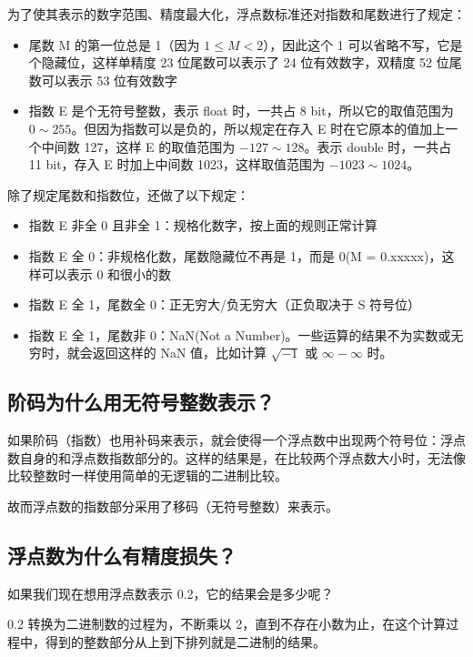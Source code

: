 为了使其表示的数字范围、精度最大化，浮点数标准还对指数和尾数进行了规定：

\begin{itemize}
  \item 尾数 M 的第一位总是 1（因为 $1 \leq M < 2$），因此这个 1 可以省略不写，它是个隐藏位，这样单精度 23 位尾数可以表示了 24 位有效数字，双精度 52 位尾数可以表示 53 位有效数字
  \item 指数 E 是个无符号整数，表示 float 时，一共占 8 bit，所以它的取值范围为 $0 \sim 255$。但因为指数可以是负的，所以规定在存入 E 时在它原本的值加上一个中间数 127，这样 E 的取值范围为 $-127 \sim 128$。表示 double 时，一共占 11 bit，存入 E 时加上中间数 1023，这样取值范围为 $-1023 \sim 1024$。
\end{itemize}

除了规定尾数和指数位，还做了以下规定：

\begin{itemize}
  \item 指数 E 非全 0 且非全 1：规格化数字，按上面的规则正常计算
  \item 指数 E 全 0：非规格化数，尾数隐藏位不再是 1，而是 0(M = 0.xxxxx)，这样可以表示 0 和很小的数
  \item 指数 E 全 1，尾数全 0：正无穷大/负无穷大（正负取决于 S 符号位）
  \item 指数 E 全 1，尾数非 0：NaN(Not a Number)。一些运算的结果不为实数或无穷时，就会返回这样的 NaN 值，比如计算 {\color{Green} $\sqrt{-1}$} 或 {\color{Green} $\infty -\infty$ } 时。
\end{itemize}

\subsection{阶码为什么用无符号整数表示？}

如果阶码（指数）也用补码来表示，就会使得一个浮点数中出现两个符号位：浮点数自身的和浮点数指数部分的。这样的结果是，在比较两个浮点数大小时，无法像比较整数时一样使用简单的无逻辑的二进制比较。

故而浮点数的指数部分采用了移码（无符号整数）来表示。

\subsection{浮点数为什么有精度损失？}

如果我们现在想用浮点数表示 0.2，它的结果会是多少呢？

0.2 转换为二进制数的过程为，不断乘以 2，直到不存在小数为止，在这个计算过程中，得到的整数部分从上到下排列就是二进制的结果。

